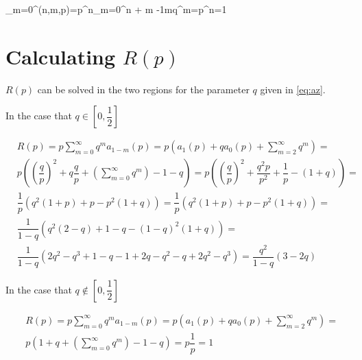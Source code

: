 \documentclass[letterpaper,12pt]{report}
\theoremstyle{plain}
\theoremstyle{definition}
\begin{document}
\sum_{m=0}^{\infty}(n,m,p)=p^n\sum_{m=0}^{\infty}{n + m -1\choose m}q^m=p^n=1

\section{Calculating $\mathit{R(p)}$ } \label{app:calcrnp}

$\mathit{R(p)}$ can be solved in the two regions for the parameter $q$ given in \ref{eq:az}.

In the case  that $q\in [0,\dfrac{1}{2}]$

\begin{eqnarray}\label{eq:rpcalc}
&\mathit{R}(p)=p\sum_{m=0}^{\infty}q^m\mathit{a}_{1-m}(p)=p\left(
\mathit{a}_1(p)+q\mathit{a}_0(p)+\sum_{m=2}^{\infty}q^m
 \right)=\\
 &p\left(
\left(\dfrac{q}{p}\right)^2+q\dfrac{q}{p}+\left(\sum_{m=0}^{\infty}q^m\right)-1-q
 \right) 
 =p\left(
\left(\dfrac{q}{p}\right)^2+\dfrac{q^2p}{p^2}+\dfrac{1}{p}-(1+q)
 \right)=\\
&\dfrac{1}{p}\left(
q^2(1+p)+p-p^2(1+q)
\right) 
 =\dfrac{1}{p}
\left(q^2(1+p)+p-p^2(1+q)
 \right)=\\
&\dfrac{1}{1-q}\left(
q^2(2-q)+1-q-(1-q)^2(1+q)
\right) 
 =\\
 &\dfrac{1}{1-q}\left(
2q^2-q^3+1-q-1+2q-q^2 -q+2q^2-q^3
\right) = \dfrac{q^2}{1-q}\left(
3-2q
\right)
\end{eqnarray}

In the case  that $q\notin [0,\dfrac{1}{2}]$

\begin{eqnarray}
&\mathit{R}(p)=p\sum_{m=0}^{\infty}q^m\mathit{a}_{1-m}(p)=p\left(
\mathit{a}_1(p)+q\mathit{a}_0(p)+\sum_{m=2}^{\infty}q^m
 \right)=\\
 &p
\left(1+q+\left(\sum_{m=0}^{\infty}q^m\right)-1-q
 \right) 
 =p\dfrac{1}{p}=1
\end{eqnarray}

\newpage

\end{document}
